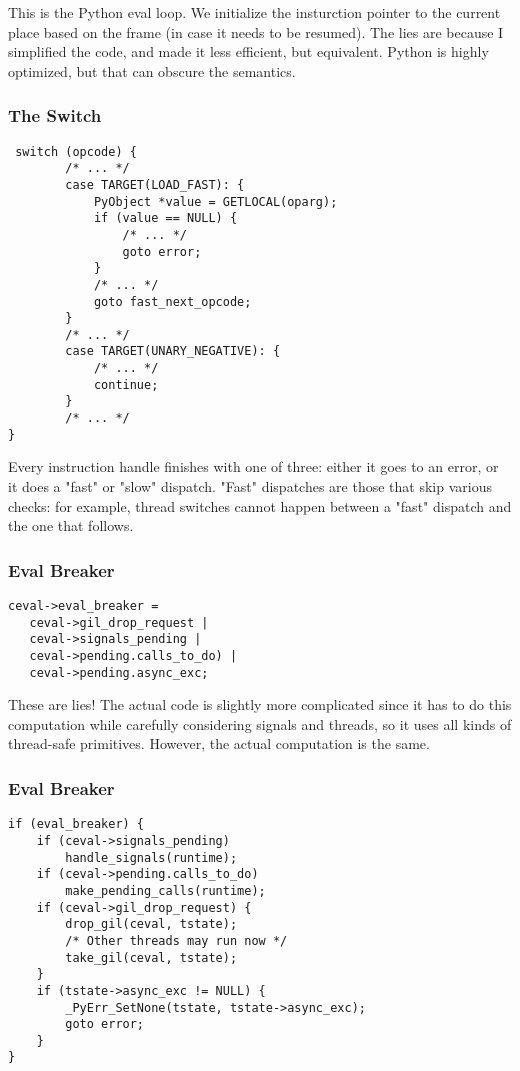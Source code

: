 This is the Python eval loop.
We initialize the insturction pointer to the current place based
on the frame
(in case it needs to be resumed).
The lies are because I simplified the code, and made it less efficient,
but equivalent. Python is highly optimized, but that can obscure
the semantics.


\begin{frame}[fragile]
\frametitle{The Switch}
\begin{lstlisting}
 switch (opcode) {
        /* ... */
        case TARGET(LOAD_FAST): {
            PyObject *value = GETLOCAL(oparg);
            if (value == NULL) {
                /* ... */
                goto error;
            }
            /* ... */
            goto fast_next_opcode;
        }
        /* ... */
        case TARGET(UNARY_NEGATIVE): {
            /* ... */
            continue;
        }
        /* ... */
}
\end{lstlisting}
\end{frame}

Every instruction handle finishes with one of three:
either it goes to an error, or it does a
"fast"
or
"slow"
dispatch.
"Fast" dispatches are those that skip various checks:
for example,
thread switches cannot happen between a "fast" dispatch
and the one that follows.

\begin{frame}[fragile]
\frametitle{Eval Breaker}
\begin{lstlisting}
ceval->eval_breaker = 
   ceval->gil_drop_request |
   ceval->signals_pending | 
   ceval->pending.calls_to_do) | 
   ceval->pending.async_exc;
\end{lstlisting}
\end{frame}

These are lies!
The actual code is slightly more complicated since it has to
do this computation while carefully considering signals and threads,
so it uses all kinds of thread-safe primitives.
However, the actual computation is the same.

\begin{frame}[fragile]
\frametitle{Eval Breaker}
\begin{lstlisting}
if (eval_breaker) {
    if (ceval->signals_pending)
        handle_signals(runtime);
    if (ceval->pending.calls_to_do)
        make_pending_calls(runtime);
    if (ceval->gil_drop_request) {
        drop_gil(ceval, tstate);
        /* Other threads may run now */
        take_gil(ceval, tstate);
    }
    if (tstate->async_exc != NULL) {
        _PyErr_SetNone(tstate, tstate->async_exc);
        goto error;
    }
}
\end{lstlisting}
\end{frame}

